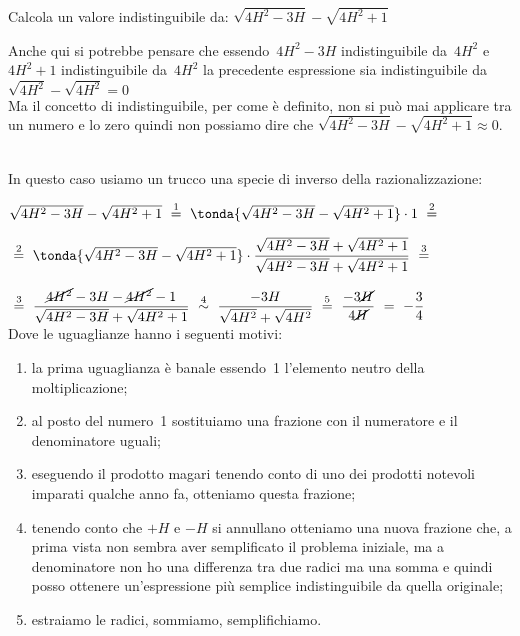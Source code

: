 \begin{esempio}
Calcola un valore indistinguibile da:
\(\sqrt{4H^2 -3H} - \sqrt{4H^2 +1}\)

\begin{osservazione}
 Anche qui si potrebbe pensare che essendo~\(4H^2 -3H\) indistinguibile 
da~\(4H^2\) e~\(4H^2 +1\) indistinguibile da~\(4H^2\) la precedente 
espressione sia indistinguibile da \\
\(\sqrt{4H^2} - \sqrt{4H^2} = 0\)\\
Ma il concetto di indistinguibile, per come è definito, non si può mai 
applicare tra un numero e lo zero quindi non possiamo dire che 
\(\sqrt{4H^2 -3H} - \sqrt{4H^2 +1} \approx 0\).
\end{osservazione}\\

In questo caso usiamo un trucco una specie di inverso della 
razionalizzazione:

\(\sqrt{4H^2 -3H} - \sqrt{4H^2 +1}
~ \stackrel{1}{=} ~
   \tonda{\sqrt{4H^2 -3H} - \sqrt{4H^2 +1}} \cdot 1 
~ \stackrel{2}{=} ~\)

\(~ \stackrel{2}{=} ~\tonda{\sqrt{4H^2 -3H}-\sqrt{4H^2 +1}} \cdot 
   \dfrac{\sqrt{4H^2 -3H}+\sqrt{4H^2 +1}}{\sqrt{4H^2 -3H}+\sqrt{4H^2+1}}
~ \stackrel{3}{=} ~\)

\(~ \stackrel{3}{=} ~
   \dfrac{\cancel{4H^2} -3H - \cancel{4H^2} -1}
         {\sqrt{4H^2 -3H}+\sqrt{4H^2+1}}
~ \stackrel{4}{\sim} ~
   \dfrac{-3H}{\sqrt{4H^2} + \sqrt{4H^2}}
~ \stackrel{5}{=} ~
   \dfrac{-3\cancel{H}}{4\cancel{H}}
~ \stackrel{}{=} ~
   -\dfrac{3}{4}\)\\

Dove le uguaglianze hanno i seguenti motivi:
\begin{enumerate} [nosep]
 \item la prima uguaglianza è banale essendo~1 l'elemento 
neutro della moltiplicazione; 
 \item al posto del numero~1 sostituiamo una frazione con 
il numeratore e il denominatore uguali; 
 \item eseguendo il prodotto magari tenendo conto di uno 
dei prodotti notevoli imparati qualche anno fa, otteniamo questa 
frazione;
 \item tenendo conto che \(+H\) e \(-H\) si annullano 
otteniamo una nuova frazione che, a prima vista non sembra 
aver semplificato il problema iniziale, 
ma a denominatore non ho una differenza tra due radici 
ma una somma e quindi posso ottenere un'espressione più semplice 
indistinguibile da quella originale;
 \item estraiamo le radici, sommiamo, semplifichiamo.
\end{enumerate}
\end{esempio}




